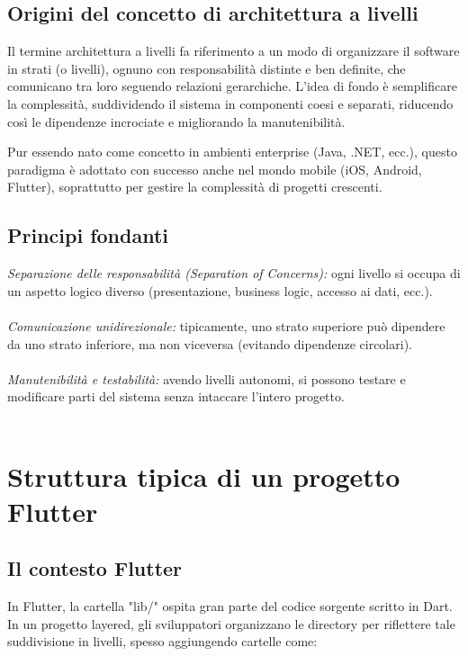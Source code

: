\documentclass[14pt]{extbook}
\begin{document}
\subsection{Origini del concetto di architettura a livelli}
Il termine architettura a livelli fa riferimento a un modo di organizzare il software in strati (o livelli), ognuno con responsabilità distinte e ben definite, che comunicano tra loro seguendo relazioni gerarchiche. L’idea di fondo è semplificare la complessità, suddividendo il sistema in componenti coesi e separati, riducendo così le dipendenze incrociate e migliorando la manutenibilità.

Pur essendo nato come concetto in ambienti enterprise (Java, .NET, ecc.), questo paradigma è adottato con successo anche nel mondo mobile (iOS, Android, Flutter), soprattutto per gestire la complessità di progetti crescenti.

\subsection{Principi fondanti}
\textit{Separazione delle responsabilità (Separation of Concerns):} ogni livello si occupa di un aspetto logico diverso (presentazione, business logic, accesso ai dati, ecc.).\\\\
\textit{Comunicazione unidirezionale:} tipicamente, uno strato superiore può dipendere da uno strato inferiore, ma non viceversa (evitando dipendenze circolari).\\\\
\textit{Manutenibilità e testabilità:} avendo livelli autonomi, si possono testare e modificare parti del sistema senza intaccare l’intero progetto.\\\\

\section{Struttura tipica di un progetto Flutter}
\subsection{Il contesto Flutter}
In Flutter, la cartella "lib/" ospita gran parte del codice sorgente scritto in Dart. In un progetto layered, gli sviluppatori organizzano le directory per riflettere tale suddivisione in livelli, spesso aggiungendo cartelle come:\\
\end{document}
